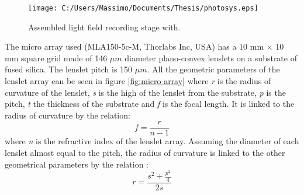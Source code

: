 \begin{figure}[H]
	\centering
	\texttt{[image: C:/Users/Massimo/Documents/Thesis/photosys.eps]}
	\caption{\label{fig:photo} Assembled light field recording stage with. }
\end{figure}
The micro array used (MLA150-5c-M, Thorlabs Inc, USA) has a 10 mm $\times$ 10 mm square grid made of 146 $\mu m$ diameter plano-convex lenslets on a substrate of fused silica. The lenslet pitch is 150 $\mu m$. All the geometric parameters of the lenslet array can be seen in figure \ref{fig:micro array} where \textit{r} is the radius of curvature of the lenslet, \textit{s} is the high of the lenslet from the substrate, \textit{p} is the pitch, \textit{t} the thickness of the substrate and \textit{f} is the focal length. It is linked to the radius of curvature by the relation:
\begin{equation}
	\label{eq:f_micro}
		f = \dfrac{r}{n-1}
\end{equation} 
where \textit{n} is the refractive index of the lenslet array.
Assuming the diameter of each lenslet almost equal to the pitch, the radius of curvature is linked to the other geometrical parameters by the relation \cite{herzig1997micro}: 
\begin{equation}
\label{eq:r_micro}
r = \dfrac{s^2+\frac{p^2}{4}}{2s}
\end{equation} 

